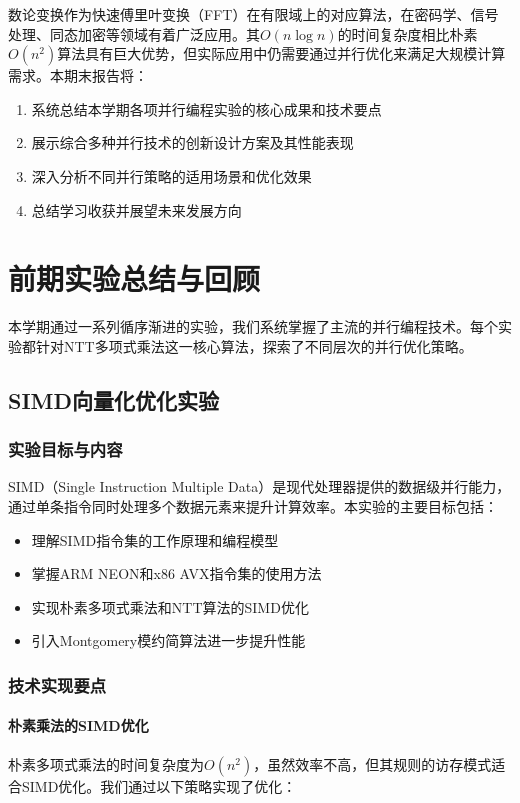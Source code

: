 \documentclass[a4paper]{article}
\begin{document}
	数论变换作为快速傅里叶变换（FFT）在有限域上的对应算法，在密码学、信号处理、同态加密等领域有着广泛应用。其$O(n\log n)$的时间复杂度相比朴素$O(n^2)$算法具有巨大优势，但实际应用中仍需要通过并行优化来满足大规模计算需求。本期末报告将：
	
	\begin{enumerate}
		\item 系统总结本学期各项并行编程实验的核心成果和技术要点
		\item 展示综合多种并行技术的创新设计方案及其性能表现
		\item 深入分析不同并行策略的适用场景和优化效果
		\item 总结学习收获并展望未来发展方向
	\end{enumerate}
	
	\section{前期实验总结与回顾}
	
	本学期通过一系列循序渐进的实验，我们系统掌握了主流的并行编程技术。每个实验都针对NTT多项式乘法这一核心算法，探索了不同层次的并行优化策略。
	
	\subsection{SIMD向量化优化实验}
	
	\subsubsection{实验目标与内容}
	
	SIMD（Single Instruction Multiple Data）是现代处理器提供的数据级并行能力，通过单条指令同时处理多个数据元素来提升计算效率。本实验的主要目标包括：
	
	\begin{itemize}
		\item 理解SIMD指令集的工作原理和编程模型
		\item 掌握ARM NEON和x86 AVX指令集的使用方法
		\item 实现朴素多项式乘法和NTT算法的SIMD优化
		\item 引入Montgomery模约简算法进一步提升性能
	\end{itemize}
	
	\subsubsection{技术实现要点}
	
	\paragraph{朴素乘法的SIMD优化}
	朴素多项式乘法的时间复杂度为$O(n^2)$，虽然效率不高，但其规则的访存模式适合SIMD优化。我们通过以下策略实现了优化：
	
\end{document}
